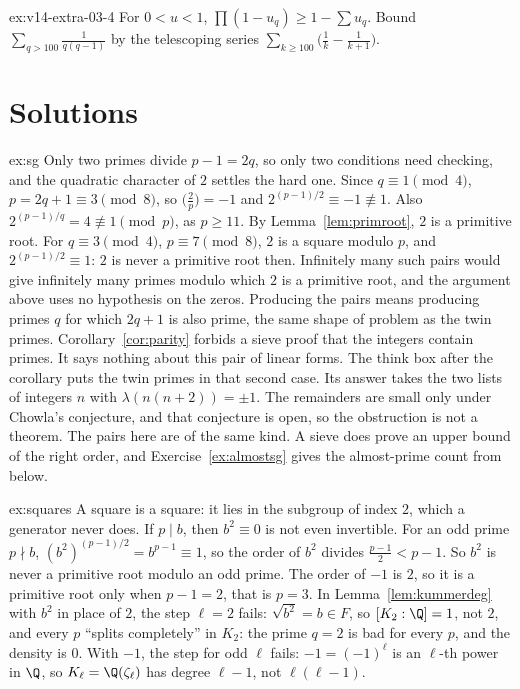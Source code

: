 \begin{hint}{ex:v14-extra-03-4}
For $0<u<1$, $\prod(1-u_q)\ge1-\sum u_q$. Bound $\sum_{q>100}\frac1{q(q-1)}$ by the telescoping series $\sum_{k\ge100}\bigl(\frac1k-\frac1{k+1}\bigr)$.
\end{hint}

\section{Solutions}

\begin{solution}{ex:sg}
\idea Only two primes divide $p-1=2q$, so only two conditions need checking, and the quadratic character of $2$ settles the hard one.
\writeup Since $q\equiv1\pmod4$, $p=2q+1\equiv3\pmod8$, so $\bigl(\frac2p\bigr)=-1$ and $2^{(p-1)/2}\equiv-1\not\equiv1$. Also $2^{(p-1)/q}=4\not\equiv1\pmod p$, as $p\ge11$. By Lemma~\ref{lem:primroot}, $2$ is a primitive root. For $q\equiv3\pmod4$, $p\equiv7\pmod8$, $2$ is a square modulo $p$, and $2^{(p-1)/2}\equiv1$: $2$ is never a primitive root then.
Infinitely many such pairs would give infinitely many primes modulo which $2$ is a primitive root, and the argument above uses no hypothesis on the zeros. Producing the pairs means producing primes $q$ for which $2q+1$ is also prime, the same shape of problem as the twin primes. Corollary~\ref{cor:parity} forbids a sieve proof that the integers contain primes. It says nothing about this pair of linear forms. The think box after the corollary puts the twin primes in that second case. Its answer takes the two lists of integers $n$ with $\lambda(n(n+2))=\pm1$. The remainders are small only under Chowla's conjecture, and that conjecture is open, so the obstruction is not a theorem. The pairs here are of the same kind. A sieve does prove an upper bound of the right order, and Exercise~\ref{ex:almostsg} gives the almost-prime count from below.
\end{solution}

\begin{solution}{ex:squares}
\idea A square is a square: it lies in the subgroup of index $2$, which a generator never does.
\writeup If $p\mid b$, then $b^2\equiv0$ is not even invertible. For an odd prime $p\nmid b$, $(b^2)^{(p-1)/2}=b^{p-1}\equiv1$, so the order of $b^2$ divides $\frac{p-1}2<p-1$. So $b^2$ is never a primitive root modulo an odd prime. The order of $-1$ is $2$, so it is a primitive root only when $p-1=2$, that is $p=3$.
In Lemma~\ref{lem:kummerdeg} with $b^2$ in place of $2$, the step $\ell=2$ fails: $\sqrt{b^2}=b\in F$, so $[K_2:\Q]=1$, not $2$, and every $p$ ``splits completely'' in $K_2$: the prime $q=2$ is bad for every $p$, and the density is $0$. With $-1$, the step for odd $\ell$ fails: $-1=(-1)^\ell$ is an $\ell$-th power in $\Q$, so $K_\ell=\Q(\zeta_\ell)$ has degree $\ell-1$, not $\ell(\ell-1)$.
\end{solution}

